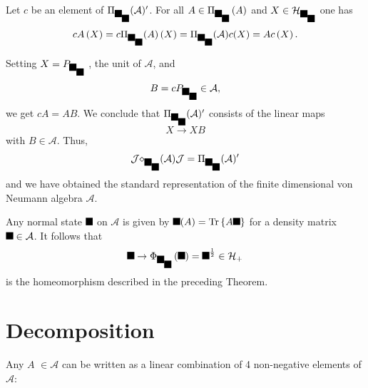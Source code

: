 \documentclass[aps,preprint]{revtex4}%
\providecommand{\U}[1]{\protect\rule{.1in}{.1in}}
\begin{document}
Let $c$ be an element of $\Pi_{\U{3c9} _{\U{3c1} }}(\mathcal{A})^{\prime}$.
For all $A\in\Pi_{\U{3c9} _{\U{3c1} }}\left(  A\right)  $ and $X\in
\mathcal{H}_{\U{3c9} _{\U{3c1} }}$ one has
\begin{equation}
cA\left(  X\right)  =c\Pi_{\U{3c9} _{\U{3c1} }}(A)\left(  X\right)
=\Pi_{\U{3c9} _{\U{3c1} }}(\mathcal{A})c(X)=Ac\left(  X\right)  .
\end{equation}


Setting $X=P_{\U{3c9} _{\U{3c1} }}$ , the unit of $\mathcal{A}$, and
\begin{equation}
B=cP_{\U{3c9} _{\U{3c1} }}\in\mathcal{A},
\end{equation}
we get $cA=AB$. We conclude that $\Pi_{\U{3c9} _{\U{3c1} }}(\mathcal{A}%
)^{\prime}$ consists of the linear maps%
\begin{equation}
X\rightarrow XB
\end{equation}
with $B\in\mathcal{A}$. Thus,
\begin{equation}
\mathcal{J\Pi_{\U{3c9} _{\U{3c1} }}(\mathcal{A})J}=\Pi_{\U{3c9} _{\U{3c1} }%
}(\mathcal{A})^{\prime}%
\end{equation}
and we have obtained the standard representation of the finite dimensional von
Neumann algebra $\mathcal{A}$.

Any normal state $\U{3bd} $ on $\mathcal{A}$ is given by $\U{3bd}
(A)=\operatorname{Tr}\left\{  A\U{3c1} \right\}  $ for a density matrix
$\U{3c1} \in\mathcal{A}$. It follows that%
\begin{equation}
\U{3bd} \rightarrow\Phi_{\U{3c9} _{\U{3c1} }}\left(  \U{3bd} \right)  =\U{3c1}
^{\frac{1}{2}}\in\mathcal{H}_{+}%
\end{equation}
is the homeomorphism described in the preceding Theorem.

\section{Decomposition}

Any $A$ $\in\mathcal{A}$ can be written as a linear combination of 4
non-negative elements of $\mathcal{A}$:
\end{document}
